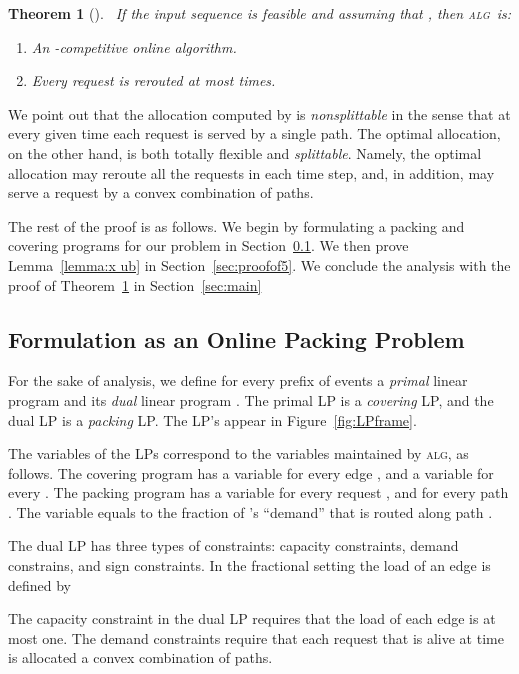 \documentclass[11pt]{article}
\newenvironment{proof sketch}[1]{\noindent {\emph{Proof sketch of #1:}}}{\hfill \qed}
\newtheorem{theorem}{Theorem}
\newcommand{\alg}{\textsc{alg}}
\begin{document}
\begin{theorem}[\cite{awerbuch2001competitive}]~\label{thm:main result}
If the input sequence  is feasible and assuming that , then \alg\ is:
 \begin{enumerate}
   \item An -competitive online algorithm.
   \item Every request is rerouted at most  times.
 \end{enumerate}
\end{theorem}

We point out that the allocation computed by  is
\emph{nonsplittable} in the sense that at every given time each
request is served by a single path.  The optimal allocation, on the
other hand, is both totally
flexible and \emph{splittable}. Namely, the optimal allocation may reroute all
the requests in each time step, and, in addition, may serve a request
by a convex combination of paths.


\medskip \noindent
The rest of the proof is as follows.
We begin by formulating a packing and covering programs for our problem in Section~\ref{sec:lp}.
We then prove Lemma~\ref{lemma:x ub} in Section~\ref{sec:proofof5}.
We conclude the analysis with the proof of Theorem~\ref{thm:main result} in Section~\ref{sec:main}
\subsection{Formulation as an Online Packing Problem}\label{sec:lp}
For the sake of analysis, we define for every prefix of events  a \emph{primal} linear program  and its \emph{dual} linear program . The primal LP is a \emph{covering} LP, and the dual LP is a \emph{packing} LP.
The LP's appear in Figure~\ref{fig:LPframe}.

The variables of the LPs correspond to the variables maintained by
\alg, as follows.  The covering program  has a variable 
for every edge , and a variable  for every .  The packing program  has a variable  for
every request , and for every path .  The
variable  equals to the fraction of 's ``demand'' that is
routed along path .

The dual LP has three types of constraints: capacity constraints,
demand constrains, and sign constraints.  In the fractional setting
the load of an edge is defined by

The capacity constraint in the dual LP requires that the load of each
edge is at most one.  The demand constraints require that each request
 that is alive at time  is allocated a convex combination of
paths.
\end{document}
